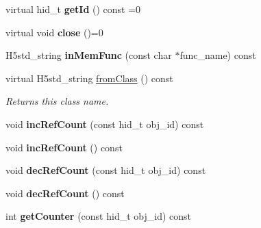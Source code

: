 \begin{DoxyCompactItemize}
\item 
\mbox{\label{class_h5_1_1_id_component_a4b5dc282b178ac71704772ae575351cc}} 
virtual hid\+\_\+t {\bfseries get\+Id} () const =0
\item 
\mbox{\label{class_h5_1_1_id_component_a222cd35221706639d021975b3cb3ad00}} 
virtual void {\bfseries close} ()=0
\item 
\mbox{\label{class_h5_1_1_id_component_ad249952e5720fd4c97d6bb4b630753f9}} 
H5std\+\_\+string {\bfseries in\+Mem\+Func} (const char $\ast$func\+\_\+name) const
\item 
\mbox{\label{class_h5_1_1_id_component_a5b2f8dc9fbc2890d10c5db9ae80ddb74}} 
virtual H5std\+\_\+string \hyperlink{class_h5_1_1_id_component_a5b2f8dc9fbc2890d10c5db9ae80ddb74}{from\+Class} () const
\begin{DoxyCompactList}\small\item\em Returns this class name. \end{DoxyCompactList}\item 
\mbox{\label{class_h5_1_1_id_component_a76eb496539e6cda23dbb30156fe3ff4a}} 
void {\bfseries inc\+Ref\+Count} (const hid\+\_\+t obj\+\_\+id) const
\item 
\mbox{\label{class_h5_1_1_id_component_a134f6652ff81848e277521fa958707eb}} 
void {\bfseries inc\+Ref\+Count} () const
\item 
\mbox{\label{class_h5_1_1_id_component_a4fb6f2791036dd7793ad465203b857e5}} 
void {\bfseries dec\+Ref\+Count} (const hid\+\_\+t obj\+\_\+id) const
\item 
\mbox{\label{class_h5_1_1_id_component_ad00eaf3bc0848fa976c1b17aa9a3f22e}} 
void {\bfseries dec\+Ref\+Count} () const
\item 
\mbox{\label{class_h5_1_1_id_component_a0e5fba13e884a3d857aae9bf07ebf427}} 
int {\bfseries get\+Counter} (const hid\+\_\+t obj\+\_\+id) const
\item 
\mbox{\label{class_h5_1_1_id_component_a6acc21053f0485d7d47721eb7d5ac88c}} 

\end{DoxyCompactItemize}
